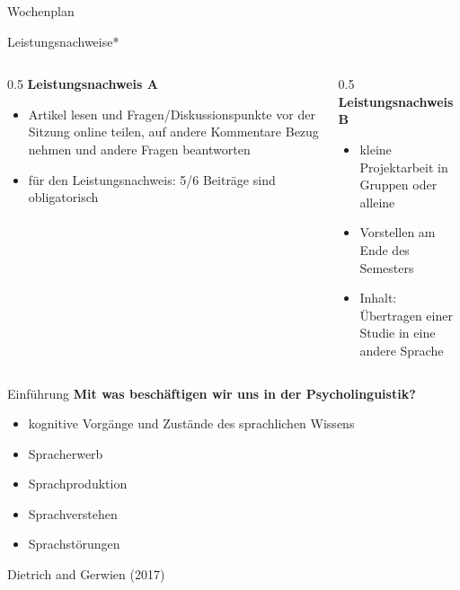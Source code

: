 \documentclass[
  ignorenonframetext,
]{beamer}
\providecommand{\tightlist}{%
  \setlength{\itemsep}{0pt}\setlength{\parskip}{0pt}}
\begin{document}
\begin{frame}
\begin{block}{Wochenplan}
\label{wochenplan}
\end{block}

\begin{block}{Leistungsnachweise*}
\label{leistungsnachweise}
\begin{columns}[T]
\begin{column}{0.5\linewidth}
{\textbf{Leistungsnachweis A}}

\begin{itemize}[<+->]
\tightlist
\item
  Artikel lesen und Fragen/Diskussionspunkte vor der Sitzung online
  teilen, auf andere Kommentare Bezug nehmen und andere Fragen
  beantworten
\item
  für den Leistungsnachweis: 5/6 Beiträge sind obligatorisch
\end{itemize}
\end{column}

\begin{column}{0.5\linewidth}
{\textbf{Leistungsnachweis B}}

\begin{itemize}[<+->]
\tightlist
\item
  kleine Projektarbeit in Gruppen oder alleine
\item
  Vorstellen am Ende des Semesters
\item
  Inhalt: Übertragen einer Studie in eine andere Sprache
\end{itemize}
\end{column}
\end{columns}

\end{block}

\begin{block}{Einführung}
\label{einfuxfchrung}
\textbf{Mit was beschäftigen wir uns in der Psycholinguistik?}

\begin{itemize}
\tightlist
\item
  kognitive Vorgänge und Zustände des sprachlichen Wissens
\item
  Spracherwerb
\item
  Sprachproduktion
\item
  Sprachverstehen
\item
  Sprachstörungen
\end{itemize}

Dietrich and Gerwien (2017)
\end{block}
\end{frame}
\end{document}
